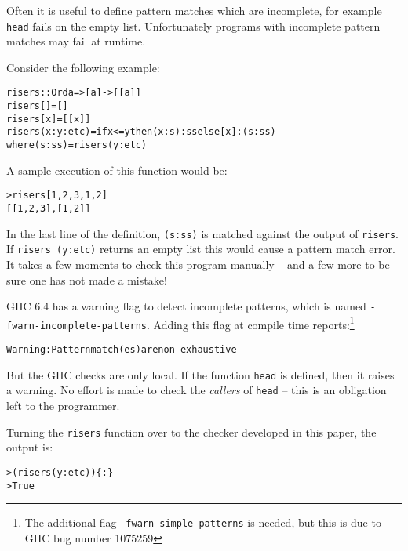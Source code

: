 \documentclass[book]{tfp05symp}
\newcommand{\T}[1]{\texttt{#1}}
\newcommand{\g}[1]{\{#1\}}
\newenvironment{code}{\begin{alltt}\small}{\end{alltt}}
\begin{document}
Often it is useful to define pattern matches which are incomplete,
for example \T{head} fails on the empty list. Unfortunately programs
with incomplete pattern matches may fail at runtime.

Consider the following example:

\begin{code}
risers :: Ord a => [a] -> [[a]]
risers [] = []
risers [x] = [[x]]
risers (x:y:etc) = if x <= y then (x:s):ss else [x]:(s:ss)
    where (s:ss) = risers (y:etc)
\end{code}

A sample execution of this function would be:

\begin{code}
> risers [1,2,3,1,2]
[[1,2,3],[1,2]]
\end{code}

In the last line of the definition, \T{(s:ss)} is matched against
the output of \T{risers}. If \T{risers (y:etc)} returns an empty
list this would cause a pattern match error. It takes a few
moments to check this program manually -- and a few more to be
sure one has not made a mistake!

GHC \cite{ghc_manual} 6.4 has a warning flag to detect incomplete
patterns, which is named \T{-fwarn-incomplete-patterns}. Adding
this flag at compile time reports:\footnote{The additional flag
\T{-fwarn-simple-patterns} is needed, but this is due to GHC bug
number 1075259}

\begin{code}
Warning: Pattern match(es) are non-exhaustive
\end{code}

\begin{comment}
The Bugs (12.2.1) section of the manual notes that the checks are
sometimes wrong, particularly with string patterns or guards, and
that this part of the compiler ``needs an overhaul really''
\cite{ghc_manual}.
\end{comment}

But the GHC checks are only local. If the function \T{head} is
defined, then it raises a warning. No effort is made to check the
\textit{callers} of \T{head} -- this is an obligation left to the
programmer.

Turning the \T{risers} function over to the checker developed in
this paper, the output is:

\begin{code}
> (risers (y:etc))\g{:}
> True
\end{code}
\end{document}
